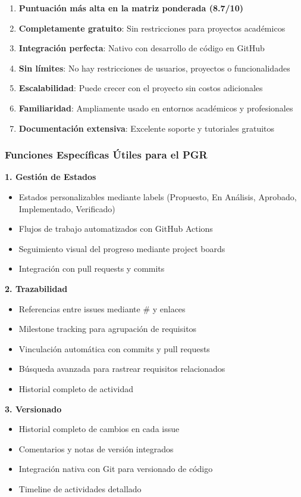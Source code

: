 \documentclass[12pt,a4paper]{article}
\begin{document}
\begin{enumerate}
    \item \textbf{Puntuación más alta en la matriz ponderada (8.7/10)}
    \item \textbf{Completamente gratuito}: Sin restricciones para proyectos académicos
    \item \textbf{Integración perfecta}: Nativo con desarrollo de código en GitHub
    \item \textbf{Sin límites}: No hay restricciones de usuarios, proyectos o funcionalidades
    \item \textbf{Escalabilidad}: Puede crecer con el proyecto sin costos adicionales
    \item \textbf{Familiaridad}: Ampliamente usado en entornos académicos y profesionales
    \item \textbf{Documentación extensiva}: Excelente soporte y tutoriales gratuitos
\end{enumerate}

\subsubsection{Funciones Específicas Útiles para el PGR}

\textbf{1. Gestión de Estados}
\begin{itemize}
    \item Estados personalizables mediante labels (Propuesto, En Análisis, Aprobado, Implementado, Verificado)
    \item Flujos de trabajo automatizados con GitHub Actions
    \item Seguimiento visual del progreso mediante project boards
    \item Integración con pull requests y commits
\end{itemize}

\textbf{2. Trazabilidad}
\begin{itemize}
    \item Referencias entre issues mediante \# y enlaces
    \item Milestone tracking para agrupación de requisitos
    \item Vinculación automática con commits y pull requests
    \item Búsqueda avanzada para rastrear requisitos relacionados
    \item Historial completo de actividad
\end{itemize}

\textbf{3. Versionado}
\begin{itemize}
    \item Historial completo de cambios en cada issue
    \item Comentarios y notas de versión integrados
    \item Integración nativa con Git para versionado de código
    \item Timeline de actividades detallado
\end{itemize}
\end{document}
